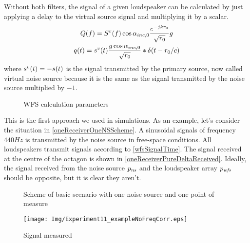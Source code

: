 Without both filters, the signal of a given loudspeaker can be calculated by just applying a delay to the virtual source signal and multiplying it by a scalar.
\begin{gather}
\signal[wfs][frequency](f) = \signal[nsVirt][frequency](f) \cos\normPrimaryPropAngleSection \frac{e^{-jk\distLinePrimSource}}{\sqrt{\distLinePrimSource}} g
\\
\signal[wfs][time](t) = \signal[nsVirt][time](t) \frac{g \cos\normPrimaryPropAngleSection}{\sqrt{\distLinePrimSource}}
\ast\delta(t - \distLinePrimSource/c)
\label{wfsSignalTime}
\end{gather}
where $\signal[nsVirt][time](t) = -\signal[ns][time](t)$ is the signal transmitted by the primary source, now called virtual noise source because it is the same as the signal transmitted by the noise source multiplied by $-1$.
\begin{figure}
	\centering
	\def\svgwidth{0.4\columnwidth}
	\graphicspath{{Img/}}
	
	\caption[WFS calculation parameters]{WFS calculation parameters}
	\label{figAngleCondition}
\end{figure}

This is the first approach we used in simulations. As an example, let's consider the situation in \autoref{oneReceiverOneNSScheme}. A sinusoidal signals of frequency $440 \si{Hz}$ is transmitted by the noise source in free-space conditions. All loudspeakers transmit signals according to \autoref{wfsSignalTime}. The signal received at the centre of the octagon is shown in \autoref{oneReceiverPureDeltaReceived}. Ideally, the signal received from the noise source $\Field[ns][time]$ and the loudspeaker array $\Field[wfs][time]$ should be opposite, but it is clear they aren't.

\begin{figure}
	\centering
	\caption[Scheme of basic scenario]{Scheme of basic scenario with one noise source and one point of measure}
	\label{oneReceiverOneNSScheme}
\end{figure}

\begin{figure}
	\centering
	\texttt{[image: Img/Experiment11\_exampleNoFreqCorr.eps]}
	\caption{Signal measured}
	\label{oneReceiverPureDeltaReceived}
\end{figure}

